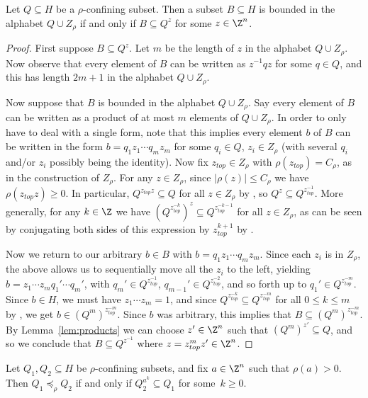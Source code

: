 \begin{prop}\label{prop:conj_is_all}
Let $Q\subseteq H$ be a $\rho$-confining subset. Then a subset $B\subseteq H$ is bounded in the alphabet $Q\cup Z_\rho$ if and only if $B \subseteq Q^z$ for some $z \in \Z^n$.
\end{prop}

\begin{proof}
First suppose $B \subseteq Q^z$. Let $m$ be the length of $z$ in the alphabet $Q\cup Z_\rho$. Now observe that every element of $B$ can be written as $z^{-1}qz$ for some $q\in Q$, and this has length $2m+1$ in the alphabet $Q\cup Z_\rho$.

Now suppose that $B$ is bounded in the alphabet $Q\cup Z_\rho$. Say every element of $B$ can be written as a product of at most $m$ elements of $Q\cup Z_\rho$. In order to only have to deal with a single form, note that this implies every element $b$ of $B$ can be written in the form $b=q_1 z_1\cdots q_m z_m$ for some $q_i\in Q$, $z_i\in Z_\rho$ (with several $q_i$ and/or $z_i$ possibly being the identity).
Now fix $z_{top}\in Z_\rho$ with $\rho(z_{top})=C_\rho$, as in the construction of $Z_\rho$. For any $z\in Z_\rho$, since $|\rho(z)|\le C_\rho$ we have $\rho(z_{top} z)\ge 0$. In particular, $Q^{z_{top} z}\subseteq Q$ for all $z\in Z_\rho$ by \StayInConf, so $Q^z\subseteq Q^{z_{top}^{-1}}$.
More generally, for any $k \in \Z$ we have $(Q^{z_{top}^{-k}})^z\subseteq Q^{z_{top}^{-k-1}}$ for all $z\in Z_\rho$, as can be seen by conjugating both sides of this expression by $z_{top}^{k+1}$ by \StayInConf.


Now we return to our arbitrary $b\in B$ with $b=q_1 z_1\cdots q_m z_m$. Since each $z_i$ is in $Z_\rho$, the above allows us to sequentially move all the $z_i$ to the left, yielding $b=z_1\cdots z_m q_1'\cdots q_m'$, with $q_m'\in Q^{z_{top}^{-1}}$, $q_{m-1}'\in Q^{z_{top}^{-2}}$, and so forth up to $q_1'\in Q^{z_{top}^{-m}}$. Since $b\in H$, we must have $z_1\cdots z_m=1$, and since $Q^{z_{top}^{-k}}\subseteq Q^{z_{top}^{-m}}$ for all $0\le k\le m$ by \StayInConf, we get $b\in (Q^m)^{z_{top}^{-m}}$. Since $b$ was arbitrary, this implies that $B\subseteq (Q^m)^{z_{top}^{-m}}$. By Lemma~\ref{lem:products} we can choose $z' \in \Z^n$ such that $(Q^m)^{z'}\subseteq Q$, and so we conclude that $B\subseteq Q^{z^{-1}}$ where $z =  z_{top}^mz' \in \Z^n$.
\end{proof}

\begin{coro}\label{cor:conjugate}
Let $Q_1,Q_2\subseteq H$ be $\rho$-confining subsets, and fix $a \in \Z^n$ such that $\rho(a) > 0$. Then $Q_1 \preceq_\rho Q_2$ if and only if $Q_2^{a^k} \subseteq Q_1$ for some~$k \geq 0$.
\end{coro}

